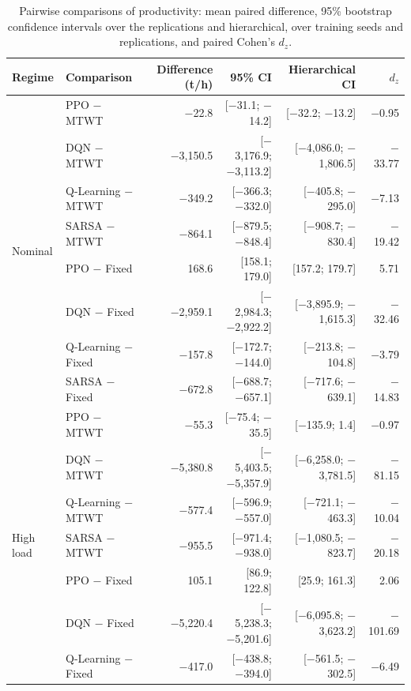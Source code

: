 \documentclass[11pt,a4paper]{article}
\newif\ifrevmarks
\newcommand{\revtag}[1]{\ifrevmarks\textsuperscript{\textcolor{red!70!black}{\scriptsize[#1]}}\fi}
\newenvironment{revbloc}[1]{\par\ifrevmarks\color{revcolor}\noindent\revtag{#1}\ \fi}{\par}
\newif\ifcorrmarks
\newenvironment{corrbloc}{\par\ifcorrmarks\color{corrcolor}\fi}{\par}
\begin{document}
\begin{revbloc}{T31}
\begin{corrbloc}
\begin{table}[H]
\centering
\caption{Pairwise comparisons of productivity: mean paired difference, 95\% bootstrap confidence intervals over the replications and hierarchical, over training seeds and replications, and paired Cohen's $d_z$.}
\label{tab:stats}
\footnotesize
\setlength{\tabcolsep}{2.5pt}
\begin{tabular}{@{}llrrrr@{}}
\toprule
\textbf{Regime} & \textbf{Comparison} & \textbf{Difference (t/h)} & \textbf{95\% CI} & \textbf{Hierarchical CI} & \textbf{$d_z$} \\
\midrule
\multirow{8}{*}{Nominal} & PPO $-$ MTWT & $-$22.8 & [$-$31.1; $-$14.2] & [$-$32.2; $-$13.2] & $-$0.95 \\
 & DQN $-$ MTWT & $-$3{,}150.5 & [$-$3{,}176.9; $-$3{,}113.2] & [$-$4{,}086.0; $-$1{,}806.5] & $-$33.77 \\
 & Q-Learning $-$ MTWT & $-$349.2 & [$-$366.3; $-$332.0] & [$-$405.8; $-$295.0] & $-$7.13 \\
 & SARSA $-$ MTWT & $-$864.1 & [$-$879.5; $-$848.4] & [$-$908.7; $-$830.4] & $-$19.42 \\
 & PPO $-$ Fixed & 168.6 & [158.1; 179.0] & [157.2; 179.7] & 5.71 \\
 & DQN $-$ Fixed & $-$2{,}959.1 & [$-$2{,}984.3; $-$2{,}922.2] & [$-$3{,}895.9; $-$1{,}615.3] & $-$32.46 \\
 & Q-Learning $-$ Fixed & $-$157.8 & [$-$172.7; $-$144.0] & [$-$213.8; $-$104.8] & $-$3.79 \\
 & SARSA $-$ Fixed & $-$672.8 & [$-$688.7; $-$657.1] & [$-$717.6; $-$639.1] & $-$14.83 \\
\midrule
\multirow{8}{*}{High load} & PPO $-$ MTWT & $-$55.3 & [$-$75.4; $-$35.5] & [$-$135.9; 1.4] & $-$0.97 \\
 & DQN $-$ MTWT & $-$5{,}380.8 & [$-$5{,}403.5; $-$5{,}357.9] & [$-$6{,}258.0; $-$3{,}781.5] & $-$81.15 \\
 & Q-Learning $-$ MTWT & $-$577.4 & [$-$596.9; $-$557.0] & [$-$721.1; $-$463.3] & $-$10.04 \\
 & SARSA $-$ MTWT & $-$955.5 & [$-$971.4; $-$938.0] & [$-$1{,}080.5; $-$823.7] & $-$20.18 \\
 & PPO $-$ Fixed & 105.1 & [86.9; 122.8] & [25.9; 161.3] & 2.06 \\
 & DQN $-$ Fixed & $-$5{,}220.4 & [$-$5{,}238.3; $-$5{,}201.6] & [$-$6{,}095.8; $-$3{,}623.2] & $-$101.69 \\
 & Q-Learning $-$ Fixed & $-$417.0 & [$-$438.8; $-$394.0] & [$-$561.5; $-$302.5] & $-$6.49 \\

\end{tabular}
\end{table}
\end{corrbloc}
\end{revbloc}
\end{document}
